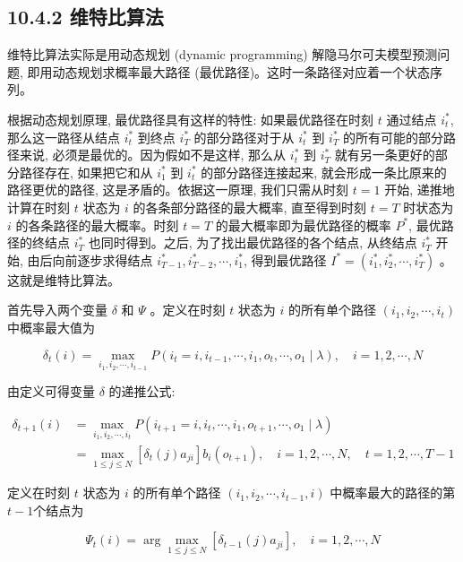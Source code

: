 \documentclass[10pt]{article}
\begin{document}
\subsection*{10.4.2 维特比算法}
维特比算法实际是用动态规划 (dynamic programming) 解隐马尔可夫模型预测问题, 即用动态规划求概率最大路径 (最优路径)。这时一条路径对应着一个状态序列。

根据动态规划原理, 最优路径具有这样的特性: 如果最优路径在时刻 $t$ 通过结点 $i_{t}^{*}$, 那么这一路径从结点 $i_{t}^{*}$ 到终点 $i_{T}^{*}$ 的部分路径对于从 $i_{t}^{*}$ 到 $i_{T}^{*}$ 的所有可能的部分路径来说, 必须是最优的。因为假如不是这样, 那么从 $i_{t}^{*}$ 到 $i_{T}^{*}$ 就有另一条更好的部分路径存在, 如果把它和从 $i_{1}^{*}$ 到 $i_{t}^{*}$ 的部分路径连接起来, 就会形成一条比原来的路径更优的路径, 这是矛盾的。依据这一原理, 我们只需从时刻 $t=1$ 开始, 递推地计算在时刻 $t$ 状态为 $i$ 的各条部分路径的最大概率, 直至得到时刻 $t=T$ 时状态为 $i$ 的各条路径的最大概率。时刻 $t=T$ 的最大概率即为最优路径的概率 $P^{*}$, 最优路径的终结点 $i_{T}^{*}$ 也同时得到。之后, 为了找出最优路径的各个结点, 从终结点 $i_{T}^{*}$ 开始, 由后向前逐步求得结点 $i_{T-1}^{*}, i_{T-2}^{*}, \cdots, i_{1}^{*}$, 得到最优路径 $I^{*}=\left(i_{1}^{*}, i_{2}^{*}, \cdots, i_{T}^{*}\right)$ 。这就是维特比算法。

首先导入两个变量 $\delta$ 和 $\Psi$ 。定义在时刻 $t$ 状态为 $i$ 的所有单个路径 $\left(i_{1}, i_{2}, \cdots, i_{t}\right)$ 中概率最大值为


\begin{equation*}
\delta_{t}(i)=\max _{i_{1}, i_{2}, \cdots, i_{t-1}} P\left(i_{t}=i, i_{t-1}, \cdots, i_{1}, o_{t}, \cdots, o_{1} \mid \lambda\right), \quad i=1,2, \cdots, N \tag{10.44}
\end{equation*}


由定义可得变量 $\delta$ 的递推公式:


\begin{align*}
\delta_{t+1}(i) & =\max _{i_{1}, i_{2}, \cdots, i_{t}} P\left(i_{t+1}=i, i_{t}, \cdots, i_{1}, o_{t+1}, \cdots, o_{1} \mid \lambda\right) \\
& =\max _{1 \leqslant j \leqslant N}\left[\delta_{t}(j) a_{j i}\right] b_{i}\left(o_{t+1}\right), \quad i=1,2, \cdots, N, \quad t=1,2, \cdots, T-1 \tag{10.45}
\end{align*}


定义在时刻 $t$ 状态为 $i$ 的所有单个路径 $\left(i_{1}, i_{2}, \cdots, i_{t-1}, i\right)$ 中概率最大的路径的第 $t-1$个结点为


\begin{equation*}
\Psi_{t}(i)=\arg \max _{1 \leqslant j \leqslant N}\left[\delta_{t-1}(j) a_{j i}\right], \quad i=1,2, \cdots, N \tag{10.46}
\end{equation*}
\end{document}
